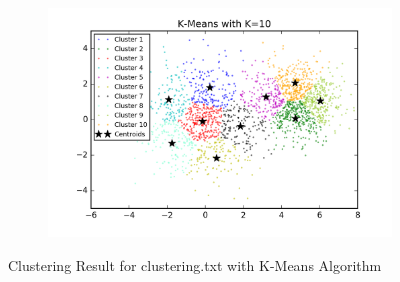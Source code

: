 \begin{description}
\begin{figure}[htb]
\begin{subfigure}[b]{0.475\textwidth}
        \end{subfigure}
        \hfill
        \begin{subfigure}[b]{0.475\textwidth}   
            \centering 
            \includegraphics[width=\textwidth]{./figures/clustering_kMeans_10.png}
        \end{subfigure}
        
        \caption{Clustering Result for clustering.txt with K-Means Algorithm}
        \label{fig:kmean_clustering}
\end{figure}


\end{description}
